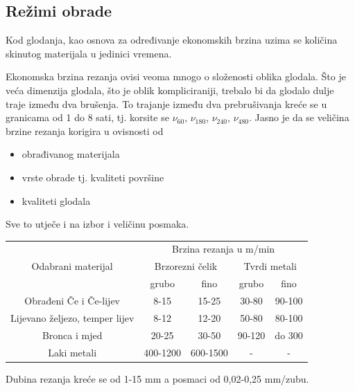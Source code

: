 \documentclass[a4paper,12pt]{article}
\numberwithin{figure}{section}
\begin{document}
\subsection{Režimi obrade}
Kod glodanja, kao osnova za određivanje ekonomskih brzina uzima se količina skinutog materijala u jedinici vremena.\par
Ekonomska brzina rezanja ovisi veoma mnogo o složenosti oblika glodala. Što je veća dimenzija glodala, što je oblik kompliciraniji, trebalo bi da glodalo dulje traje između dva brušenja. To trajanje između dva prebrušivanja kreće se u granicama od 1 do 8 sati, tj. korsite se ${\nu}_{60}$, ${\nu}_{180}$, ${\nu}_{240}$, ${\nu}_{480}$.
Jasno je da se veličina brzine rezanja korigira u ovisnosti od 
\begin{itemize}
\item obrađivanog materijala
\item vrste obrade tj. kvaliteti površine
\item kvaliteti glodala
\end{itemize}
Sve to utječe i na izbor i veličinu posmaka.
\begin{table}[!h]
\centering
\begin{tabular}{|c|c|c|c|c|}
\hline
\multirow{3}{*}{Odabrani materijal} & \multicolumn{4}{c|}{Brzina rezanja u m/min}                              \\ \cline{2-5} 
                                    & \multicolumn{2}{c|}{Brzorezni čelik} & \multicolumn{2}{c|}{Tvrdi metali} \\ \cline{2-5} 
                                    & grubo             & fino             & grubo           & fino            \\ \hline
Obrađeni Če i Če-lijev              & 8-15              & 15-25            & 30-80           & 90-100          \\ \hline
Lijevano željezo, temper lijev                    & 8-12              & 12-20            & 50-80           & 80-100          \\ \hline
Bronca i mjed                       & 20-25             & 30-50            & 90-120          & do 300          \\ \hline
Laki metali                         & 400-1200          & 600-1500         & -               & -               \\ \hline
\end{tabular}
\end{table}
\FloatBarrier
Dubina rezanja kreće se od 1-15 mm a posmaci od 0,02-0,25 mm/zubu.
\end{document}
